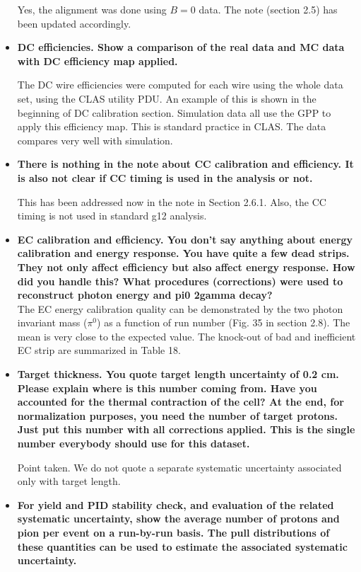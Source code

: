 \documentclass[ 12 pt]{article}
\begin{document}
\begin{itemize}
Yes, the alignment was done using $B=0$ data. The note (section 2.5) has been updated accordingly.

\item \textbf{DC efficiencies. Show a comparison of the real data and MC data with DC efficiency map applied.}

The DC wire efficiencies were computed for each wire using the whole data set, using the CLAS utility PDU. An example of this is shown in the beginning of DC calibration section. Simulation data all use the GPP to apply this efficiency map. This is standard practice in CLAS. The data compares very well with simulation.

\item \textbf{There is nothing in the note about CC calibration and efficiency. It is also not clear if CC timing is used in the analysis or not.}

This has been addressed now in the note in Section 2.6.1. Also, the CC timing is not used in standard g12 analysis.


\item \textbf{EC calibration and efficiency. You don't say anything about energy calibration
and energy response. You have quite a few dead strips. They not only affect
efficiency but also affect energy response. How did you handle this? What
procedures (corrections) were used to reconstruct photon energy and pi0
2gamma decay?}\\


The EC energy calibration quality can be demonstrated by the two photon invariant mass ($\pi^0$) as a function of run number (Fig. 35 in section 2.8). The mean is very close to the expected value. The knock-out of bad and inefficient EC strip are summarized in Table 18.

\item \textbf{Target thickness. You quote target length uncertainty of 0.2 cm. Please
explain where is this number coming from. Have you accounted for the
thermal contraction of the cell? At the end, for normalization purposes, you
need the number of target protons. Just put this number with all corrections
applied. This is the single number everybody should use for this dataset.}

Point taken. We do not quote a separate systematic uncertainty associated only with target length.


\item \textbf{For yield and PID stability check, and evaluation of the related systematic
uncertainty, show the average number of protons and pion per event on a
run-by-run basis. The pull distributions of these quantities can be used to
estimate the associated systematic uncertainty.}


\end{itemize}
\end{document}
